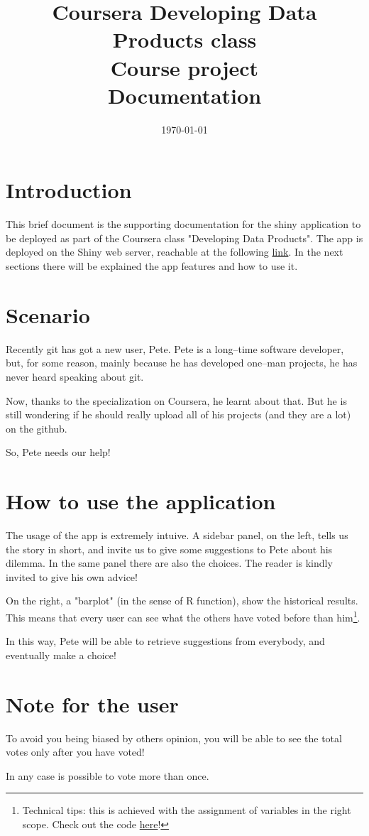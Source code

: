 \documentclass[a4paper,12pt]{article}
\title{Coursera Developing Data Products class\\ Course project\\Documentation}
\author{}
\date{\today}
\begin{document}
\maketitle

\section*{Introduction}
This brief document is the supporting documentation for the shiny application to be deployed as part of the Coursera class "Developing Data Products". The app is deployed on the Shiny web server, reachable at the following \href{https://pgrandinetti.shinyapps.io/shinyApp}{link}. In the next sections there will be explained the app features and how to use it.

\section*{Scenario}
Recently git has got a new user, Pete. Pete is a long--time software developer, but, for some reason, mainly because he has developed one--man projects, he has never heard speaking about git.

Now, thanks to the specialization on Coursera, he learnt about that. But he is still wondering if he should really upload all of his projects (and they are a lot) on the github.

So, Pete needs our help!

\section*{How to use the application}
The usage of the app is extremely intuive. A sidebar panel, on the left, tells us the story in short, and invite us to give some suggestions to Pete about his dilemma. In the same panel there are also the choices. The reader is kindly invited to give his own advice!

On the right, a "barplot" (in the sense of R function), show the historical results. This means that every user can see what the others have voted before than him\footnote{Technical tips: this is achieved with the assignment of variables in the right scope. Check out the code \href{https://github.com/pgrandinetti/dataproductclass}{here}!}.

In this way, Pete will be able to retrieve suggestions from everybody, and eventually make a choice!

\section*{Note for the user}
To avoid you being biased by others opinion, you will be able to see the total votes only after you have voted!

In any case is possible to vote more than once.
\end{document}
